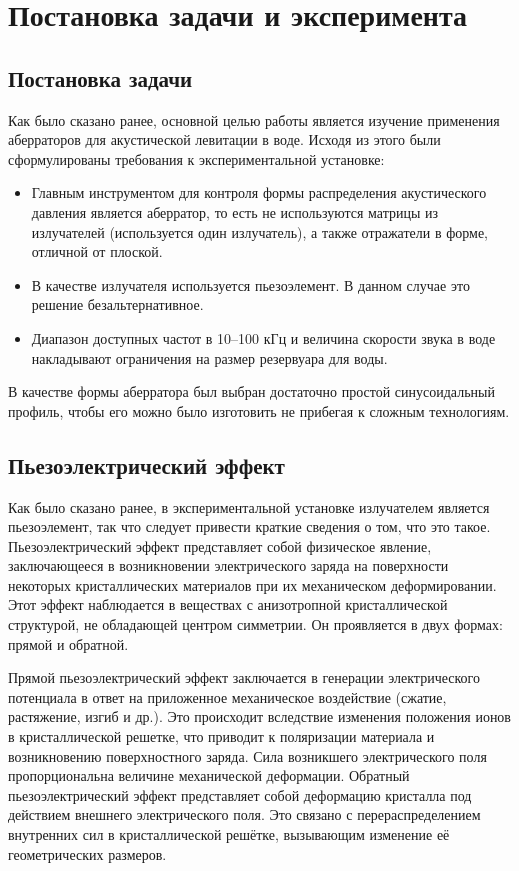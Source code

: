\section{Постановка задачи и эксперимента}
\label{sec:Chapter3} 

\subsection{Постановка задачи}
Как было сказано ранее, основной целью работы является изучение применения аберраторов для акустической левитации в воде. Исходя из этого были сформулированы требования к экспериментальной установке:
\begin{itemize}
	\item Главным инструментом для контроля формы распределения акустического давления является аберратор, то есть не используются матрицы из излучателей (используется один излучатель), а также отражатели в форме, отличной от плоской.
	\item В качестве излучателя используется пьезоэлемент. В данном случае это решение безальтернативное.
	\item Диапазон доступных частот в 10--100 кГц и величина скорости звука в воде накладывают ограничения на размер резервуара для воды.
\end{itemize}
В качестве формы аберратора был выбран достаточно простой синусоидальный профиль, чтобы его можно было изготовить не прибегая к сложным технологиям. 
\subsection{Пьезоэлектрический эффект}
Как было сказано ранее, в экспериментальной установке излучателем является пьезоэлемент, так что следует привести краткие сведения о том, что это такое. Пьезоэлектрический эффект представляет собой физическое явление, заключающееся в возникновении электрического заряда на поверхности некоторых кристаллических материалов при их механическом деформировании. Этот эффект наблюдается в веществах с анизотропной кристаллической структурой, не обладающей центром симметрии. Он проявляется в двух формах: прямой и обратной.

Прямой пьезоэлектрический эффект заключается в генерации электрического потенциала в ответ на приложенное механическое воздействие (сжатие, растяжение, изгиб и др.). Это происходит вследствие изменения положения ионов в кристаллической решетке, что приводит к поляризации материала и возникновению поверхностного заряда. Сила возникшего электрического поля пропорциональна величине механической деформации. Обратный пьезоэлектрический эффект представляет собой деформацию кристалла под действием внешнего электрического поля. Это связано с перераспределением внутренних сил в кристаллической решётке, вызывающим изменение её геометрических размеров.

